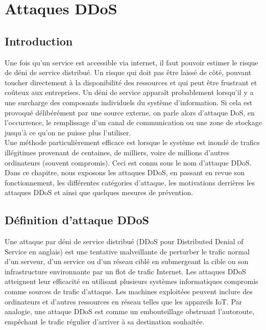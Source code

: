 \chapter{Attaques DDoS} 
\section{Introduction}
	Une fois qu’un service est accessible via internet, il faut pouvoir estimer le risque de déni de service distribué. Un risque qui doit pas être laissé de côté, pouvant toucher directement à la disponibilité des ressources et qui peut être frustrant et coûteux aux entreprises. Un déni de service apparaît probablement lorsqu’il y a une surcharge des composants individuels du système d’information. Si cela est provoqué délibérément par une source externe, on parle alors d’attaque DoS, en l’occurrence, le remplissage d’un canal de communication ou une zone de stockage jusqu’à ce qu’on ne puisse plus l’utiliser.\\

Une méthode particulièrement efficace est lorsque le système est inondé de trafics illégitimes provenant de centaines, de milliers, voire de millions d’autres ordinateurs (souvent compromis). Ceci est connu sous le nom d’attaque DDoS.\\

Dans ce chapitre, nous exposons les attaques DDoS, en passant en revue son fonctionnement, les différentes catégories d’attaque, les motivations derrières les attaques DDoS et ainsi que quelques mesures de prévention.


	\section{Définition d’attaque DDoS}
	Une attaque par déni de service distribué (DDoS pour Distributed Denial of Service en anglais) est une tentative malveillante de perturber le trafic normal d'un serveur, d'un service ou d'un réseau ciblé en submergeant la cible ou son infrastructure environnante par un flot de trafic Internet. Les attaques DDoS atteignent leur efficacité en utilisant plusieurs systèmes informatiques compromis comme sources de trafic d'attaque. Les machines exploitées peuvent inclure des ordinateurs et d'autres ressources en réseau telles que les appareils IoT. Par analogie, une attaque DDoS est comme un embouteillage obstruant l'autoroute, empêchant le trafic régulier d'arriver à sa destination souhaitée\cite{cloudflareddos}.\\

